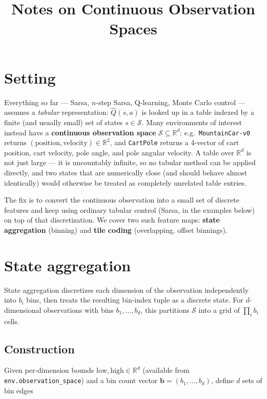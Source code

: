\documentclass[11pt]{article}
\title{Notes on Continuous Observation Spaces}
\author{}
\date{}
\begin{document}
\maketitle

\section{Setting}

Everything so far — Sarsa, $n$-step Sarsa, Q-learning, Monte Carlo control —
assumes a \emph{tabular} representation: $\hat{Q}(s,a)$ is looked up in a
table indexed by a finite (and usually small) set of states $s \in
\mathcal{S}$. Many environments of interest instead have a
\textbf{continuous observation space} $\mathcal{S} \subseteq \mathbb{R}^d$:
e.g.\ \texttt{MountainCar-v0} returns $(\text{position}, \text{velocity}) \in
\mathbb{R}^2$, and \texttt{CartPole} returns a 4-vector of cart position,
cart velocity, pole angle, and pole angular velocity. A table over
$\mathbb{R}^d$ is not just large — it is uncountably infinite, so no
tabular method can be applied directly, and two states that are numerically
close (and should behave almost identically) would otherwise be treated as
completely unrelated table entries.

The fix is to convert the continuous observation into a small set of
discrete features and keep using ordinary tabular control (Sarsa, in the
examples below) on top of that discretization. We cover two such feature
maps: \textbf{state aggregation} (binning) and \textbf{tile coding}
(overlapping, offset binnings).

\section{State aggregation}

State aggregation discretizes each dimension of the observation
independently into $b_i$ bins, then treats the resulting bin-index tuple
as a discrete state. For $d$-dimensional observations with bins
$b_1, \dots, b_d$, this partitions $\mathcal{S}$ into a grid of
$\prod_i b_i$ cells.

\subsection{Construction}

Given per-dimension bounds $\text{low}, \text{high} \in \mathbb{R}^d$
(available from \texttt{env.observation\_space}) and a bin count vector
$\mathbf{b} = (b_1, \dots, b_d)$, define $d$ sets of bin edges
\end{document}
